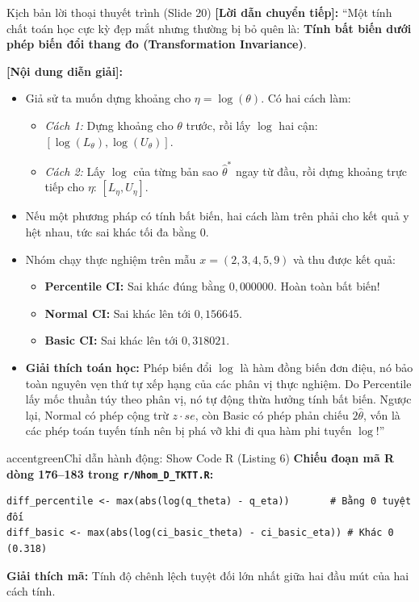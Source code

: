\documentclass[10pt,a4paper]{article}
\begin{document}
\begin{scriptbox}{Kịch bản lời thoại thuyết trình (Slide 20)}
    \textbf{[Lời dẫn chuyển tiếp]:} ``Một tính chất toán học cực kỳ đẹp mắt nhưng thường bị bỏ quên là: \textbf{Tính bất biến dưới phép biến đổi thang đo (Transformation Invariance)}.
    
    \textbf{[Nội dung diễn giải]:} 
    \begin{itemize}
        \item Giả sử ta muốn dựng khoảng cho $\eta = \log(\theta)$. Có hai cách làm:
        \begin{itemize}
            \item \textit{Cách 1:} Dựng khoảng cho $\theta$ trước, rồi lấy $\log$ hai cận: $[\log(L_\theta), \log(U_\theta)]$.
            \item \textit{Cách 2:} Lấy $\log$ của từng bản sao $\hat\theta^*$ ngay từ đầu, rồi dựng khoảng trực tiếp cho $\eta$: $[L_\eta, U_\eta]$.
        \end{itemize}
        \item Nếu một phương pháp có tính bất biến, hai cách làm trên phải cho kết quả y hệt nhau, tức sai khác tối đa bằng $0$.
        \item Nhóm chạy thực nghiệm trên mẫu $x=(2, 3, 4, 5, 9)$ và thu được kết quả:
        \begin{itemize}
            \item \textbf{Percentile CI:} Sai khác đúng bằng \textbf{$0{,}000000$}. Hoàn toàn bất biến!
            \item \textbf{Normal CI:} Sai khác lên tới \textbf{$0{,}156645$}.
            \item \textbf{Basic CI:} Sai khác lên tới \textbf{$0{,}318021$}.
        \end{itemize}
        \item \textbf{Giải thích toán học:} Phép biến đổi $\log$ là hàm đồng biến đơn điệu, nó bảo toàn nguyên vẹn thứ tự xếp hạng của các phân vị thực nghiệm. Do Percentile lấy mốc thuần túy theo phân vị, nó tự động thừa hưởng tính bất biến. Ngược lại, Normal có phép cộng trừ $z \cdot se$, còn Basic có phép phản chiếu $2\hat\theta$, vốn là các phép toán tuyến tính nên bị phá vỡ khi đi qua hàm phi tuyến $\log$!''
    \end{itemize}
\end{scriptbox}

\begin{actionbox}{accentgreen}{Chỉ dẫn hành động: Show Code R (Listing 6)}
    \textbf{Chiếu đoạn mã R dòng 176--183 trong \texttt{r/Nhom\_D\_TKTT.R}:}
\begin{verbatim}
diff_percentile <- max(abs(log(q_theta) - q_eta))       # Bằng 0 tuyệt đối
diff_basic <- max(abs(log(ci_basic_theta) - ci_basic_eta)) # Khác 0 (0.318)
\end{verbatim}
    \textbf{Giải thích mã:} Tính độ chênh lệch tuyệt đối lớn nhất giữa hai đầu mút của hai cách tính.
\end{actionbox}
\end{document}
